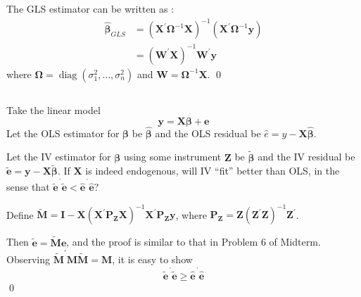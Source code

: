 \documentclass[12pt, a4paper,oneside,leqno]{article}
\renewenvironment{proof}{\noindent{ Proof.}\hspace*{1em}}{\qed\vspace{1em}\\}
\begin{document}
\begin{spacing}{1.3}
       {\begin{shaded}
          \begin{proof}
The GLS estimator can be written as :
\begin{align*}
  \widehat{\bm{\beta} }_{GLS} &= \left( \bm{X}^\prime \bm{\Omega}^{-1} \bm{X}   \right)^{-1} \left( \bm{X}^\prime \bm{\Omega}^{-1} \bm{y}    \right) \\
  &= \left( \bm{W}^\prime \bm{X}   \right)^{-1} \bm{W}^\prime \bm{y}  
\end{align*}
where $\bm{\Omega} = \operatorname{diag}\left( \sigma^2_{1},\dots,\sigma^2_{n} \right) $ and $\bm{W} = \bm{\Omega}^{-1} \bm{X}   $.
           \end{proof}\vspace{-2.5em}

       \end{shaded}} 


{\begin{shaded}\vspace{-2em}
    \section*{\large {}}   \vspace{-1.5em}
Take the linear model \[
  \bm{y} = \bm{X}\bm{\beta} + \bm{e}    
\]
Let the OLS estimator for $\bm{\beta} $  be $\widehat{\bm{\beta} } $ and the OLS residual be $\widehat{e} = y - \bm{X}\widehat{\bm{\beta} }   $.

Let the IV estimator for $\bm{\beta} $ using some instrument $\bm{Z} $ be $\widetilde{\bm{\beta} } $ and the 
IV residual be $\widetilde{\bm{e} } = \bm{y} - \bm{X}\widetilde{\bm{\beta} }.    $ If $\bm{X} $ is indeed endogenous, will IV ``fit'' better than OLS, in the sense that $\widetilde{\bm{e} }^{\,^\prime} \widetilde{\bm{e} } < \widehat{\bm{e} }^{\,^\prime} \widehat{\bm{e} }?    $
\end{shaded}}
\vspace{-1.5em}

       {\begin{shaded}
          \begin{proof}
            Define $\widetilde{\bm{M} } = \bm{I} - \bm{X}\left( \bm{X}^\prime \bm{P} _{\bm{Z} } \bm{X}   \right)^{-1} \bm{X}^\prime \bm{P} _{\bm{Z} } \bm{y}     $, where $\bm{P} _{\bm{Z} } = \bm{Z}\left( \bm{Z}^\prime \bm{Z}   \right)^{-1} \bm{Z}^\prime  $.

            Then $\widetilde{\bm{e} } = \widetilde{\bm{M} }\bm{e}   $, and the proof is similar to that in Problem 6 of Midterm. Observing $\widetilde{\bm{M} }^\prime \bm{M}\widetilde{\bm{M} } = \bm{M}    $, it is easy to show \[
              \widetilde{\bm{e} }^{\,^\prime} \widetilde{\bm{e} } \geqslant \widehat{\bm{e} }^{\,^\prime} \widehat{\bm{e} }   
            \]
           \end{proof}\vspace{-2.5em}

       \end{shaded}} 

\end{spacing}
\end{document}
